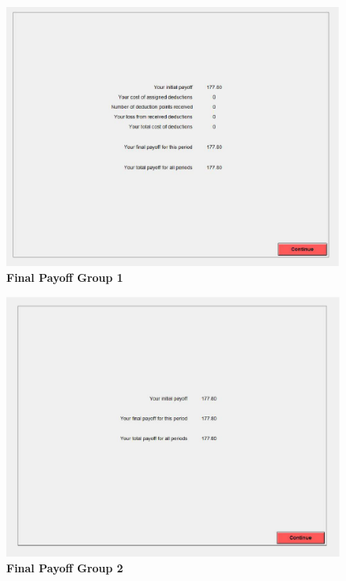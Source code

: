 \documentclass[12pt]{article}
\begin{document}
\centering
\begin{figure}[H]
\includegraphics[width=40pc]{fpg1_zm}
\caption*{\bf Final Payoff Group 1}
\end{figure}

\newpage

\centering
\begin{figure}[H]
\includegraphics[width=40pc]{finalpayoff2ZM}
\caption*{\bf Final Payoff Group 2}
\end{figure}

\newpage







\end{document}
